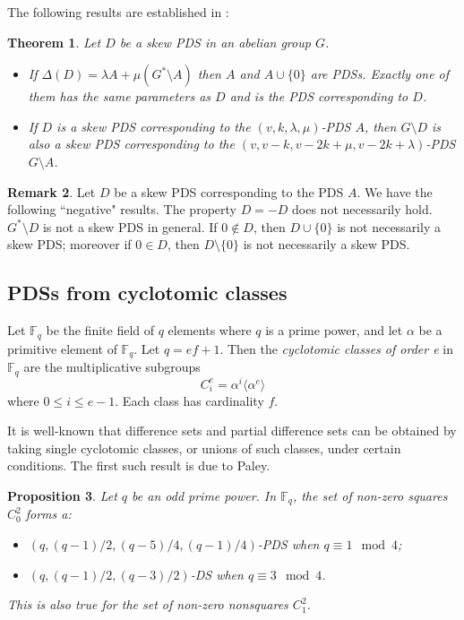 \documentclass[12pt, a4paper]{article}
\newtheorem{theorem}{Theorem}[section]
\newtheorem{proposition}[theorem]{Proposition}
\theoremstyle{definition}
\newtheorem{remark}[theorem]{Remark}
\begin{document}
The following results are established in \cite{AnbKalMei}: 
\begin{theorem}\label{thm:skewPDScomp}
Let $D$ be a skew PDS in an abelian group $G$.
\begin{itemize}
\item[(i)] If $\Delta(D)=\lambda A+ \mu(G^* \setminus A)$ then $A$ and $A \cup \{0\}$ are PDSs.  Exactly one of them has the same parameters as $D$ and is the PDS corresponding to $D$. 
\item[(ii)] If $D$ is a skew PDS corresponding to the $(v, k,  \lambda, \mu)$-PDS $A$, then $G \setminus D$ is also a skew PDS corresponding to  the $(v, v- k, v -2k  + \mu, v -2k + \lambda)$-PDS $G \setminus A$. 
\end{itemize}
\end{theorem}

\begin{remark}
Let $D$ be a skew PDS corresponding to the PDS $A$. We have the following ``negative" results.   The property $D=-D$ does not necessarily hold. $G^* \setminus D$ is not a skew PDS in general.  If $0 \notin D$, then $D \cup \{0\}$ is not necessarily a skew PDS; moreover if $0 \in D$, then $D \setminus \{0\}$ is not necessarily a skew PDS. 
\end{remark}

\subsection{PDSs from cyclotomic classes}

Let $\mathbb{F}_q$ be the finite field of $q$ elements where $q$ is a prime power, and let $\alpha$ be a primitive element of $\mathbb{F}_q$.  Let $q=ef+1$.  Then the \emph{cyclotomic classes of order e} in $\mathbb{F}_q$ are the multiplicative subgroups
$$ C_i^e= \alpha^i \langle \alpha^e \rangle$$
where $0 \leq i \leq e-1$. Each class has cardinality $f$.

It is well-known that difference sets and partial difference sets can be obtained by taking single cyclotomic classes, or unions of such classes, under certain conditions.  The first such result is due to Paley.

\begin{proposition}
Let $q$ be an odd prime power.  In $\mathbb{F}_q$,    the set of non-zero squares $C_0^2$ forms a:
\begin{itemize}
\item[(i)] $(q,(q-1)/2,(q-5)/4,(q-1)/4)$-PDS when $q \equiv 1 \mod 4$;
\item[(ii)] $(q,(q-1)/2,(q-3)/2)$-DS when $q \equiv 3 \mod 4$.
\end{itemize}
This is also true for the set of non-zero nonsquares $C_1^2$.
\end{proposition}
\end{document}
